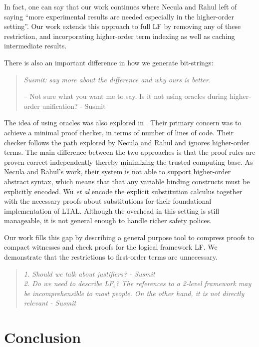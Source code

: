 \documentclass{acmconf}
\newenvironment{note}{\begin{quote}\message{note!}\it}{\end{quote}}
\begin{document}
In fact, one can say that  our work continues where Necula and Rahul
left of saying ``more experimental results are needed especially in
the higher-order setting''. Our work extends this approach to full LF
by removing any of these restriction, and incorporating higher-order
term indexing as well as caching intermediate results.

There is also
an important difference in how we generate bit-strings:

\begin{note}
  Susmit: say more about the difference and why ours is better.

-- Not sure what you want me to say. Is it not using oracles during
   higher-order unification? - Susmit
\end{note}

The idea of using oracles was also explored in
\cite{Appel:PPDP03}. Their primary concern was to 
achieve a minimal proof checker, in terms of number of lines of
code. Their checker follows the path explored by Necula and Rahul and
ignores higher-order terms. The main difference between the two
approaches is that the proof rules are proven correct
independently thereby minimizing the trusted computing base.
As Necula and Rahul's work, their system is not able to support
higher-order abstract syntax, which means that  
that any variable binding constructs must be
explicitly encoded. Wu {\em et al}\cite{Appel:PPDP03}
encode the explicit substitution calculus \cite{Abadi:POPL90} together
with the necessary proofs about substitutions for their foundational
implementation of LTAL. Although the overhead in this setting is still
manageable, it is not general enough to handle richer safety polices.

 Our work fills this gap by describing a general purpose tool to
 compress proofs to compact witnesses and check proofs for the logical
framework LF. We demonstrate that the restrictions to first-order terms
are unnecessary. 

\begin{note}
 1. Should we talk about justifiers? - Susmit \\
 2. Do we need to describe LF$_i$? The references to a 2-level framework 
    may be incomprehensible to most people. On the other hand, it is not
    directly relevant - Susmit
\end{note}

\section{Conclusion}




\end{document}
